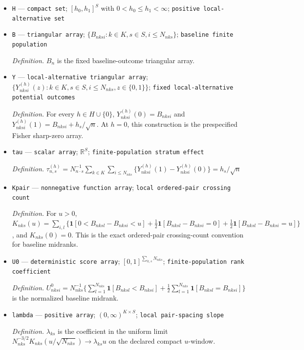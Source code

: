 \documentclass{article}
\begin{document}
\begin{itemize}
  \item \texttt{H} --- \texttt{compact set}; \([h_0,h_1]^S\) with \(0<h_0\le h_1<\infty\); \texttt{positive local-\allowbreak{}alternative set}
  \item \texttt{B} --- \texttt{triangular array}; \(\{B_{nksi}:k\in K,s\in S,i\le N_{nks}\}\); \texttt{baseline finite population}
  \par\smallskip\noindent\emph{Definition.} \(B_n\) is the fixed baseline-outcome triangular array.
  \item \texttt{Y} --- \texttt{local-\allowbreak{}alternative triangular array}; \(\{Y^{(h)}_{nksi}(z):k\in K,s\in S,i\le N_{nks},z\in\{0,1\}\}\); \texttt{fixed local-\allowbreak{}alternative potential outcomes}
  \par\smallskip\noindent\emph{Definition.} For every \(h\in H\cup\{0\}\), \(Y^{(h)}_{nksi}(0)=B_{nksi}\) and \(Y^{(h)}_{nksi}(1)=B_{nksi}+h_s/\sqrt n\). At \(h=0\), this construction is the prespecified Fisher sharp-zero array.
  \item \texttt{tau} --- \texttt{scalar array}; \(\mathbb{R}^{S}\); \texttt{finite-\allowbreak{}population stratum effect}
  \par\smallskip\noindent\emph{Definition.} \(\tau^{(h)}_{n,s}=N_{n\cdot s}^{-1}\sum_{k\in K}\sum_{i\le N_{nks}}\{Y^{(h)}_{nksi}(1)-Y^{(h)}_{nksi}(0)\}=h_s/\sqrt n\)
  \item \texttt{Kpair} --- \texttt{nonnegative function array}; \texttt{local ordered-\allowbreak{}pair crossing count}
  \par\smallskip\noindent\emph{Definition.} For \(u>0\), \(K_{nks}(u)=\sum_{i,l}\{\mathbf 1[0<B_{nksl}-B_{nksi}<u]+\tfrac12\mathbf 1[B_{nksl}-B_{nksi}=0]+\tfrac12\mathbf 1[B_{nksl}-B_{nksi}=u]\}\), and \(K_{nks}(0)=0\). This is the exact ordered-pair crossing-count convention for baseline midranks.
  \item \texttt{U0} --- \texttt{deterministic score array}; \([0,1]^{\sum_{k,s}N_{nks}}\); \texttt{finite-\allowbreak{}population rank coefficient}
  \par\smallskip\noindent\emph{Definition.} \(U^0_{nksi}=N_{nks}^{-1}\{\sum_{l=1}^{N_{nks}}\mathbf 1[B_{nksl}<B_{nksi}]+\tfrac12\sum_{l=1}^{N_{nks}}\mathbf 1[B_{nksl}=B_{nksi}]\}\) is the normalized baseline midrank.
  \item \texttt{lambda} --- \texttt{positive array}; \((0,\infty)^{K\times S}\); \texttt{local pair-\allowbreak{}spacing slope}
  \par\smallskip\noindent\emph{Definition.} \(\lambda_{ks}\) is the coefficient in the uniform limit \(N_{nks}^{-3/2}K_{nks}(u/\sqrt{N_{nks}})\to\lambda_{ks}u\) on the declared compact \(u\)-window.

\end{itemize}
\end{document}
